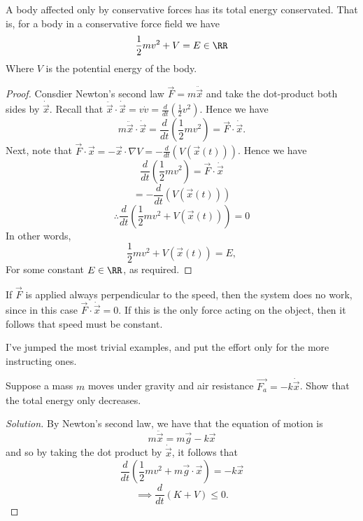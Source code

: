 \begin{proposition}
  A body affected only by conservative forces has its total energy conservated.
  That is, for a body in a conservative force field we have
  \[\frac{1}{2}mv^2+ V = E\in\RR\]
  Where $V$ is the potential energy of the body.
  \label{prop:conservationEnergyConservativeField}
\end{proposition}
\begin{proof}
  Consdier Newton's second law $\vec{F}=m\ddot{\vec{x}}$ and take the
  dot-product both sides by $\dot{\vec{x}}$. Recall that $\ddot{\vec{x}}\cdot
  \dot{\vec{x}}=v\dot{v}=\frac{d}{dt}\left( \frac{1}{2}v^2 \right)$. Hence we
  have 
  \[m\ddot{\vec{x}}\cdot\dot{\vec{x}} = \frac{d}{dt}\left( \frac{1}{2}mv^2
  \right)= \vec{F}\cdot\dot{\vec{x}}.\]
  Next, note that $\vec{F}\cdot\vec{x}=-\vec{x}\cdot\nabla
  V=-\frac{d}{dt}\left( V(\vec{x}(t)) \right)$. Hence we have 
  \[\frac{d}{dt}\left( \frac{1}{2}mv^2 \right)= \vec{F}\cdot\dot{\vec{x}}\]
  \[= -\frac{d}{dt}\left( V(\vec{x}(t)) \right)\]
  \[\therefore \frac{d}{dt}\left( \frac{1}{2}mv^2+V(\vec{x}(t)) \right)=0\]
  In other words, 
  \[\frac{1}{2}mv^2+V(\vec{x}(t))= E,\]
  For some constant $E\in\RR$, as required.
\end{proof}
\begin{remark}
  If $\vec{F}$ is applied always perpendicular to the speed, then the system
  does no work, since in this case $\vec{F}\cdot\dot{\vec{x}}=0$. If this is the
  only force acting on the object, then it follows that speed must be constant.
\end{remark}

I've jumped the most trivial examples, and put the effort only for the more
instructing ones.
\begin{example}
  Suppose a mass $m$ moves under gravity and air resistance
  $\vec{F_a}=-k\dot{\vec{x}}$. Show that the total energy only decreases.
\end{example}
\begin{proof}[Solution]
  By Newton's second law, we have that the equation of motion is 
  \[m\ddot{\vec{x}} = m\vec{g} - k\vec{x}\]
  and so by taking the dot product by $\dot{\vec{x}}$, it follows that 
  \[\frac{d}{dt}\left( \frac{1}{2}mv^2 + m\vec{g}\cdot\vec{x} \right) =
  -k\vec{x}\]
  \[\implies \frac{d}{dt}(K+V)\leq 0.\]
\end{proof}

